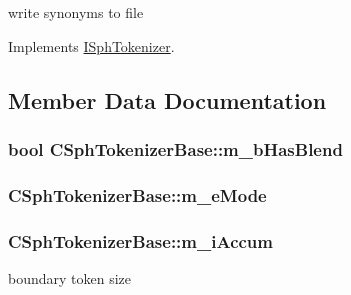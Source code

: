 write synonyms to file 



Implements \hyperlink{classISphTokenizer_af5b14e86d535494f3d9fd0d3110788d4}{I\-Sph\-Tokenizer}.



\subsection{Member Data Documentation}
\hypertarget{classCSphTokenizerBase_ad344f074c9772a71a6d5a1be2869922a}{
\subsubsection[{m\-\_\-b\-Has\-Blend}]{\setlength{\rightskip}{0pt plus 5cm}bool C\-Sph\-Tokenizer\-Base\-::m\-\_\-b\-Has\-Blend\hspace{0.3cm}{\ttfamily [protected]}}}\label{classCSphTokenizerBase_ad344f074c9772a71a6d5a1be2869922a}
\hypertarget{classCSphTokenizerBase_a352b7f652fc7f1ea1ec260cdf9be9ff3}{
\subsubsection[{m\-\_\-e\-Mode}]{ C\-Sph\-Tokenizer\-Base\-::m\-\_\-e\-Mode\hspace{0.3cm}{\ttfamily [protected]}}}\label{classCSphTokenizerBase_a352b7f652fc7f1ea1ec260cdf9be9ff3}
\hypertarget{classCSphTokenizerBase_af4c77469a943d78f19f53ba5726ec734}{
\subsubsection[{m\-\_\-i\-Accum}]{ C\-Sph\-Tokenizer\-Base\-::m\-\_\-i\-Accum\hspace{0.3cm}{\ttfamily [protected]}}}\label{classCSphTokenizerBase_af4c77469a943d78f19f53ba5726ec734}


boundary token size 

